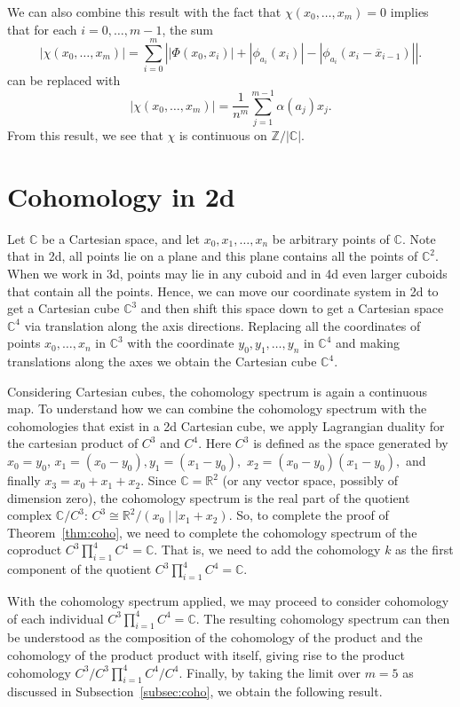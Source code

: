\documentclass[a4paper,reqno,oneside]{article}
\begin{document}
We can also combine this result with the fact that $\chi(x_0,\dots,x_m)=0$ implies that for each $i=0,\dots,m-1$, the sum
\[
|\chi(x_0,\dots,x_m)|=\sum_{i=0}^{m}\left||\Phi(x_0,x_{i})|+|\phi_{a_i}(x_{i})| -|\phi_{a_i}(x_{i}-\overline{x}_{i-1})|
\right|.
\]
can be replaced with
\[
|\chi(x_0,\dots,x_m)|=\frac{1}{n^m}\sum_{j=1}^{m-1}\alpha(a_j)x_j.
\]
From this result, we see that $\chi$ is continuous on $\mathbb Z/|\mathbb C|$.

\section{Cohomology in 2d} \label{subsec:2d}

Let $\mathbb C$ be a Cartesian space, and let $x_0,x_1,\dots,x_n$ be arbitrary points of $\mathbb C$. Note that in 2d, all points lie on a plane and this plane contains all the points of $\mathbb C^2$. When we work in 3d, points may lie in any cuboid and in 4d even larger cuboids that contain all the points. Hence, we can move our coordinate system in 2d to get a Cartesian cube $\mathbb C^3$ and then shift this space down to get a Cartesian space $\mathbb C^4$ via translation along the axis directions. Replacing all the coordinates of points $x_0,\dots,x_n$ in $\mathbb C^3$ with the coordinate $y_0,y_1,\dots,y_n$ in $\mathbb C^4$ and making translations along the axes we obtain the Cartesian cube $\mathbb C^4$.

Considering Cartesian cubes, the cohomology spectrum is again a continuous map. 
To understand how we can combine the cohomology spectrum with the cohomologies that exist in a 2d Cartesian cube, we apply Lagrangian duality for the cartesian product of $C^{3}$ and $C^{4}$. Here $C^{3}$ is defined as the space generated by $x_0=y_0$, $x_1=(x_0-y_0),y_1=(x_1-y_0),$ $x_2=(x_0-y_0)(x_1-y_0),$ and finally $x_3=x_0+x_1+x_2$. Since $\mathbb C=\mathbb R^2$ (or any vector space, possibly of dimension zero), the cohomology spectrum is the real part of the quotient complex $\mathbb C/C^{3}$: $C^{3}\cong \mathbb R^2/(x_0\mid \mid x_1+x_2).$ So, to complete the proof of Theorem~\ref{thm:coho}, we need to complete the cohomology spectrum of the coproduct $C^{3}\prod_{i=1}^4 C^{4}=\mathbb C$. That is, we need to add the cohomology $k$ as the first component of the quotient $C^{3}\prod_{i=1}^4 C^{4} = \mathbb C$.

With the cohomology spectrum applied, we may proceed to consider cohomology of each individual $C^{3}\prod_{i=1}^4 C^{4}=\mathbb C$. The resulting cohomology spectrum can then be understood as the composition of the cohomology of the product and the cohomology of the product product with itself, giving rise to the product cohomology $C^{3}/C^{3}\prod_{i=1}^4 C^{4}/C^{4}$. Finally, by taking the limit over $m=5$ as discussed in Subsection~\ref{subsec:coho}, we obtain the following result.
\end{document}
